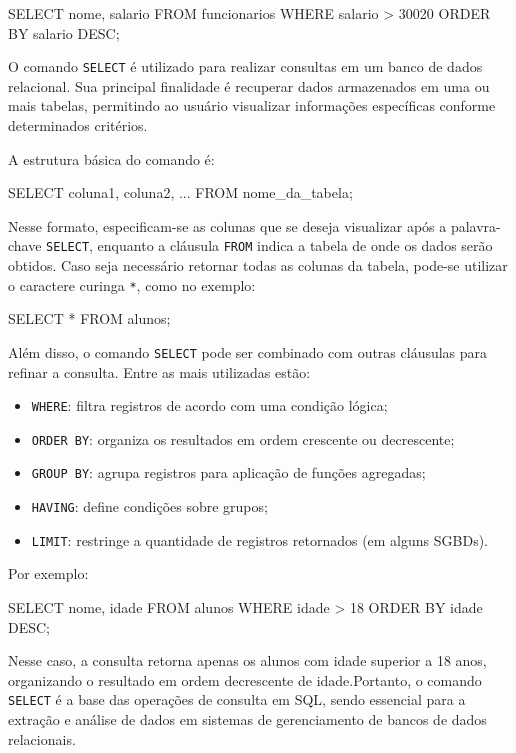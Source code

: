 \begin{sqlcode}
SELECT nome, salario
FROM funcionarios
WHERE salario > 30020
ORDER BY salario DESC; 
\end{sqlcode}

O comando \texttt{SELECT} é utilizado para realizar consultas em um banco de dados relacional. Sua principal finalidade é recuperar dados armazenados em uma ou mais tabelas, permitindo ao usuário visualizar informações específicas conforme determinados critérios.

A estrutura básica do comando é:

\begin{sqlcode}
SELECT coluna1, coluna2, ...
FROM nome_da_tabela;
\end{sqlcode}

Nesse formato, especificam-se as colunas que se deseja visualizar após a palavra-chave \texttt{SELECT}, enquanto a cláusula \texttt{FROM} indica a tabela de onde os dados serão obtidos. Caso seja necessário retornar todas as colunas da tabela, pode-se utilizar o caractere curinga \texttt{*}, como no exemplo:

\begin{sqlcode}
SELECT * FROM alunos;
\end{sqlcode}

Além disso, o comando \texttt{SELECT} pode ser combinado com outras cláusulas para refinar a consulta. Entre as mais utilizadas estão:

\begin{itemize}
    \item \texttt{WHERE}: filtra registros de acordo com uma condição lógica;
    \item \texttt{ORDER BY}: organiza os resultados em ordem crescente ou decrescente;
    \item \texttt{GROUP BY}: agrupa registros para aplicação de funções agregadas;
    \item \texttt{HAVING}: define condições sobre grupos;
    \item \texttt{LIMIT}: restringe a quantidade de registros retornados (em alguns SGBDs).
\end{itemize}

Por exemplo:

\begin{sqlcode}
SELECT nome, idade
FROM alunos
WHERE idade > 18
ORDER BY idade DESC;
\end{sqlcode}

Nesse caso, a consulta retorna apenas os alunos com idade superior a 18 anos, organizando o resultado em ordem decrescente de idade.Portanto, o comando \texttt{SELECT} é a base das operações de consulta em SQL, sendo essencial para a extração e análise de dados em sistemas de gerenciamento de bancos de dados relacionais.

